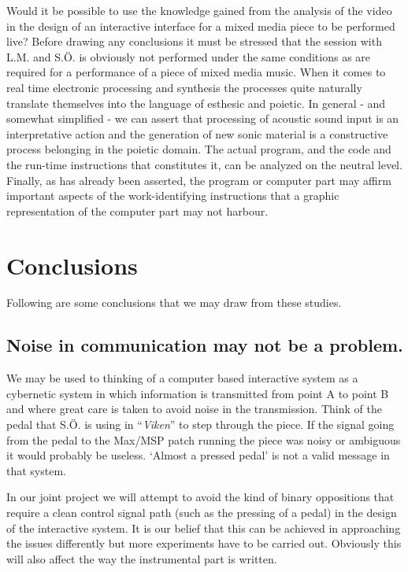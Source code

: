 \documentclass[10pt,letterpaper]{article}
\begin{document}
Would it be possible to use the knowledge gained from the analysis of
the video in the design of an interactive interface for a mixed media
piece to be performed live?  Before drawing any conclusions it must be
stressed that the session with L.M. and S.{\"O}. is obviously not
performed under the same conditions as are required for a performance of
a piece of mixed media music.
When it comes to real time electronic
processing and synthesis the processes quite naturally translate
themselves into the language of esthesic and poietic. In general - and
somewhat simplified - we can assert that processing of acoustic sound
input is an interpretative action and the generation of new sonic
material is a constructive process belonging in the poietic domain. The
actual program, and the code and the run-time instructions that
constitutes it, can be analyzed on the neutral level. Finally, as has
already been asserted, the program or computer part may affirm important
aspects of the work-identifying instructions that a graphic
representation of the computer part may not harbour.

\section{Conclusions}
Following are some conclusions that we may draw from these studies.

\subsection{Noise in communication may not be a problem.}

We may be used to thinking of a computer based interactive system as a
cybernetic system in which information is transmitted from point A to
point B and where great care is taken to avoid noise in the
transmission. Think of the pedal that S.{\"O}. is using in ``\emph{Viken}'' to step
through the piece. If the signal going from the pedal to the Max/MSP
patch running the piece was noisy or ambiguous it would probably be
useless. `Almost a pressed pedal' is not a valid message in that system.
	
In our joint project we will attempt to avoid the kind of binary
oppositions that require a clean control signal path (such as the
pressing of a pedal) in the design of the interactive system. It is our
belief that this can be achieved in approaching the issues differently
but more experiments have to be carried out. Obviously this will also
affect the way the instrumental part is written.
\end{document}
